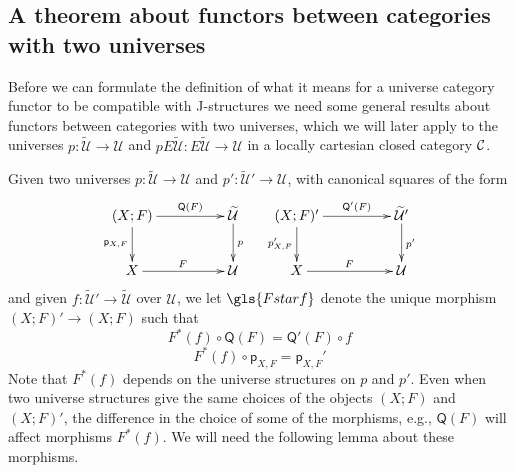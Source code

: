\documentclass[12pt]{article}
\numberwithin{equation}{section}
\newenvironment{eq}{\begin{equation}}{\end{equation}}
\newcommand{\sr}{\rightarrow}
\newcommand{\wt}{\widetilde}
\newcommand{\spc}{{\,\,\,\,\,\,\,}}
\newcommand{\p}{\mathsf{p}}
\newcommand{\U}{\mathcal{U}}
\newcommand{\Q}{\mathsf{Q}}
\begin{document}
\subsection{A theorem about functors between categories with two universes}
\label{twouniv}

Before we can formulate the definition of what it means for a universe category
functor to be compatible with J-structures we need some general results about
functors between categories with two universes, which we will later apply to the
universes $p:\wt{\U}\sr \U$ and $pE\wt{\U}:E\wt{\U}\sr \U$ in a locally cartesian
closed category $\cal C$.

Given two universes 
$p:\wt{\U}\sr \U$ and $p':\wt{\U}'\sr \U$, with canonical squares of the form
%
$$
\begin{xy}
          \xymatrix@C=4pc{ (X;F) \ar[r]^-{\Q(F)} \ar[d]_{\p_{X,F}} & \wt{\U}
            \ar[d]^{p}\\ X \ar[r]^{F} & \U }
\end{xy}
\spc
\begin{xy}
          \xymatrix@C=4pc{ (X;F)' \ar[r]^-{\Q'(F)} \ar[d]_{p'_{X,F}} & \wt{\U}'
            \ar[d]^{p'}\\ X \ar[r]^{F} & \U }
\end{xy}
$$
%
and given $f:\wt{\U}'\sr \wt{\U}$ over $\U$, we let $\gls{Fstarf}$ denote the unique morphism
$(X;F)'\sr (X;F)$ such that
%
\begin{eq}\label{2015.04.08.eq3}
F^*(f)\circ \Q(F)=\Q'(F)\circ f
\end{eq}%
%
\begin{eq}\label{2015.04.08.eq4}
F^*(f)\circ \p_{X,F}=\p_{X,F}'
\end{eq}%
%
Note that $F^*(f)$ depends on the universe structures on $p$ and $p'$. Even
when two universe structures give the same choices of the objects $(X;F)$ and
$(X;F)'$, the difference in the choice of some of the morphisms, e.g., $\Q(F)$
will affect morphisms $F^*(f)$. We will need the following lemma about these
morphisms.
\end{document}
